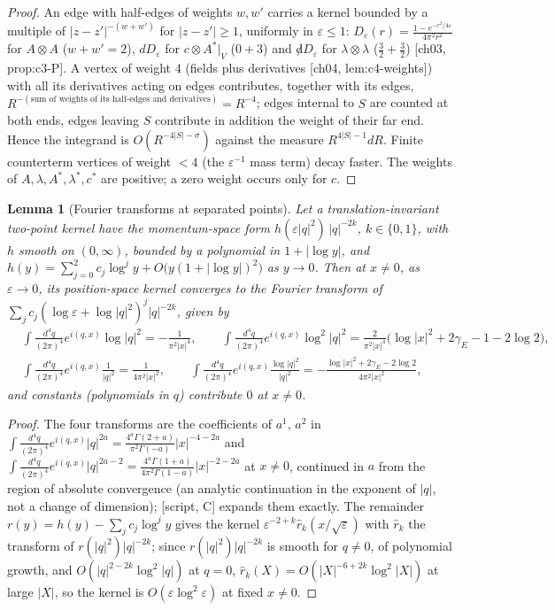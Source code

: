 \documentclass[11pt]{report}
\theoremstyle{plain}
\newtheorem{lemma}[theorem]{Lemma}
\theoremstyle{definition}
\numberwithin{equation}{chapter}
\begin{document}
\begin{proof}
An edge with half-edges of weights $w,w'$ carries a kernel bounded by a multiple of $|z-z'|^{-(w+w')}$ for $|z-z'|\ge1$, uniformly in $\varepsilon\le1$: $D_\varepsilon(r)=\frac{1-e^{-r^2/4\varepsilon}}{4\pi^2r^2}$ for $A\otimes A$ ($w+w'=2$), $dD_\varepsilon$ for $c\otimes A^*|_V$ ($0+3$) and ${\not d}D_\varepsilon$ for $\lambda\otimes\lambda$ ($\tfrac32+\tfrac32$) [ch03, prop:c3-P]. A vertex of weight $4$ (fields plus derivatives [ch04, lem:c4-weights]) with all its derivatives acting on edges contributes, together with its edges, $R^{-(\text{sum of weights of its half-edges and derivatives})}=R^{-4}$; edges internal to $S$ are counted at both ends, edges leaving $S$ contribute in addition the weight of their far end. Hence the integrand is $O(R^{-4|S|-\sigma})$ against the measure $R^{4|S|-1}dR$. Finite counterterm vertices of weight $<4$ (the $\varepsilon^{-1}$ mass term) decay faster. The weights of $A,\lambda,A^*,\lambda^*,c^*$ are positive; a zero weight occurs only for $c$.
\end{proof}

\begin{lemma}[Fourier transforms at separated points]
\label{lem:t-ft}
Let a translation-invariant two-point kernel have the momentum-space form $h(\varepsilon|q|^2)\,|q|^{-2k}$, $k\in\{0,1\}$, with $h$ smooth on $(0,\infty)$, bounded by a polynomial in $1+|\log y|$, and $h(y)=\sum_{j=0}^2c_j\log^jy+O\big(y(1+|\log y|)^2\big)$ as $y\to0$. Then at $x\neq0$, as $\varepsilon\to0$, its position-space kernel converges to the Fourier transform of $\sum_jc_j(\log\varepsilon+\log|q|^2)^j|q|^{-2k}$, given by
\[
\begin{aligned}
&\int\tfrac{d^4q}{(2\pi)^4}e^{i(q,x)}\log|q|^2=-\frac{1}{\pi^2|x|^4},\qquad \int\tfrac{d^4q}{(2\pi)^4}e^{i(q,x)}\log^2|q|^2=\frac{2}{\pi^2|x|^4}\big(\log|x|^2+2\gamma_E-1-2\log2\big),\\
&\int\tfrac{d^4q}{(2\pi)^4}e^{i(q,x)}\frac{1}{|q|^2}=\frac{1}{4\pi^2|x|^2},\qquad \int\tfrac{d^4q}{(2\pi)^4}e^{i(q,x)}\frac{\log|q|^2}{|q|^2}=-\frac{\log|x|^2+2\gamma_E-2\log2}{4\pi^2|x|^2},
\end{aligned}
\]
and constants (polynomials in $q$) contribute $0$ at $x\neq0$.
\end{lemma}

\begin{proof}
The four transforms are the coefficients of $a^1$, $a^2$ in $\int\frac{d^4q}{(2\pi)^4}e^{i(q,x)}|q|^{2a}=\frac{4^a\Gamma(2+a)}{\pi^2\Gamma(-a)}|x|^{-4-2a}$ and $\int\frac{d^4q}{(2\pi)^4}e^{i(q,x)}|q|^{2a-2}=\frac{4^a\Gamma(1+a)}{4\pi^2\Gamma(1-a)}|x|^{-2-2a}$ at $x\neq0$, continued in $a$ from the region of absolute convergence (an analytic continuation in the exponent of $|q|$, not a change of dimension); [script, C] expands them exactly. The remainder $r(y)=h(y)-\sum_jc_j\log^jy$ gives the kernel $\varepsilon^{-2+k}\hat r_k(x/\sqrt\varepsilon)$ with $\hat r_k$ the transform of $r(|q|^2)|q|^{-2k}$; since $r(|q|^2)|q|^{-2k}$ is smooth for $q\neq0$, of polynomial growth, and $O(|q|^{2-2k}\log^2|q|)$ at $q=0$, $\hat r_k(X)=O(|X|^{-6+2k}\log^2|X|)$ at large $|X|$, so the kernel is $O(\varepsilon\log^2\varepsilon)$ at fixed $x\neq0$.
\end{proof}
\end{document}

